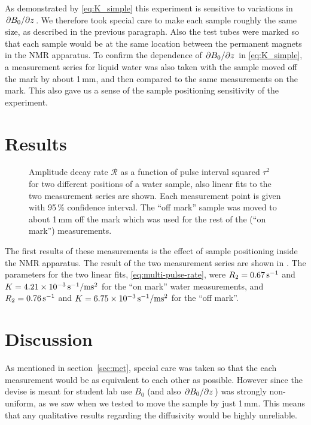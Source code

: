 \documentclass[11pt,a4paper, twocolumn,
swedish, english %
]{article}
\begin{document}
As demonstrated by \eqref{eq:K_simple} this experiment is sensitive to
variations in $\pdv*{B_0}{z}$. We therefore took special care to make
each sample roughly the same size, as described in the previous
paragraph. Also the test tubes were marked so that each sample would 
be at the same location between the permanent magnets in the NMR
apparatus. To confirm the dependence of $\pdv*{B_0}{z}$ in
\eqref{eq:K_simple}, a measurement series for liquid water was also
taken with the sample moved off the mark by about 1\,mm, and then
compared to the same measurements on the mark. This also gave us a
sense of the sample positioning sensitivity of the experiment.



\section{Results}

\begin{figure}
\centering

\caption{Amplitude decay rate $\mathcal{R}$ as a function of pulse
  interval squared $\tau^2$ for two different positions of a water
  sample, also linear fits to the two measurement series are
  shown. Each measurement point is given with 95\,\% confidence
  interval. The ``off mark'' sample was moved to about 1\,mm off the
  mark which was used for the rest of the (``on mark'') measurements. } 
\label{fig:water-pos}
\end{figure}

The first results of these measurements is the effect of sample
positioning inside the NMR apparatus. The result of the two
measurement series are shown in .
The parameters for the two linear fits, \eqref{eq:multi-pulse-rate},
were $R_2=\unit[0.67]{s^{-1}}$ and  
$K=\unit[4.21\times10^{-3}]{s^{-1}/ms^2}$ for the ``on mark'' water
measurements, and $R_2=\unit[0.76]{s^{-1}}$ and
$K=\unit[6.75\times10^{-3}]{s^{-1}/ms^2}$ for the ``off mark''.





\section{Discussion}

As mentioned in section~\ref{sec:met}, special care was taken so that
the each measurement would be as equivalent to each other as
possible. However since the devise is meant for student lab use $B_0$
(and also $\pdv*{B_0}{z}$) was strongly non-uniform, as we saw when we
tested to move the sample by just 1\,mm. This means that any
qualitative results regarding the diffusivity would be highly
unreliable. 
\end{document}
